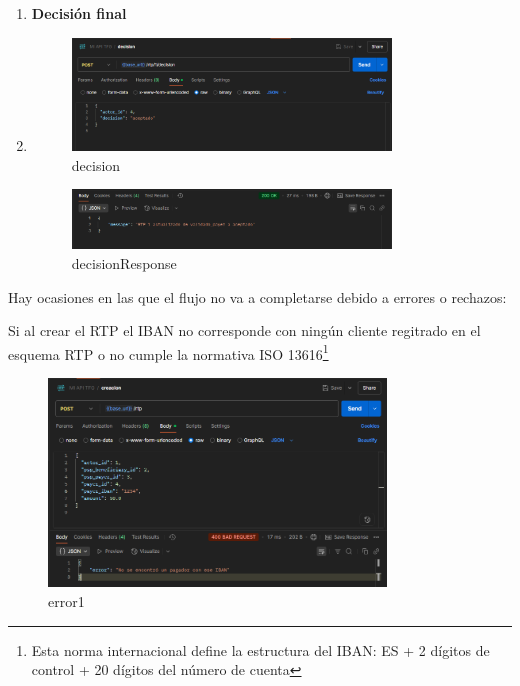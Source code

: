 \begin{enumerate}
\item \textbf{Decisión final}
\item 
    \begin{figure}[H]
    \centering
    \includegraphics[width=0.8\textwidth]{Imagenes/decision.png}
    \caption{decision}
    \label{fig:decision}
    \end{figure}

    \begin{figure}[H]
    \centering
    \includegraphics[width=0.8\textwidth]{Imagenes/decisionResponse.png}
    \caption{decisionResponse}
    \label{fig:decisionResponse}
    \end{figure}
\end{enumerate}

Hay ocasiones en las que el flujo no va a completarse debido a errores o rechazos:

Si al crear el RTP el IBAN no corresponde con ningún cliente regitrado en el esquema RTP o no cumple la normativa ISO 13616\footnote{Esta norma internacional define la estructura del IBAN: ES + 2 dígitos de control + 20 dígitos del número de cuenta}

    \begin{figure}[H]
    \centering
    \includegraphics[width=0.8\textwidth]{Imagenes/error1.png}
    \caption{error1}
    \label{fig:error1}
    \end{figure}

